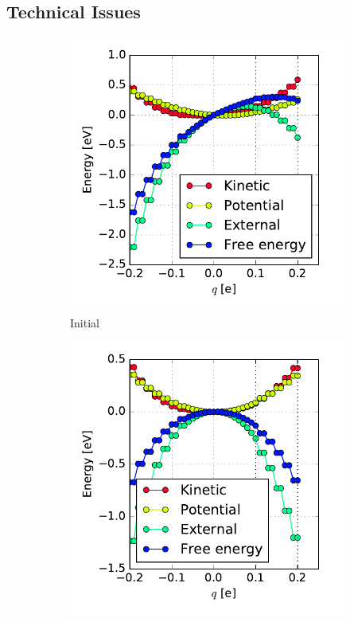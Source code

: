 \subsection{Technical Issues}
\label{section_technical_issues}
\begin{figure}
	\centering
	\begin{subfigure}{0.45\textwidth}
		\centering
		\includegraphics[width = \textwidth]{Images/Hydrogen/charging/energy_contributions_asymmetric}
		\caption{Initial}
		\label{image_contributions_initial}
	\end{subfigure}\hspace*{1cm}
	\begin{subfigure}{0.45\textwidth}
		\centering
		\includegraphics[width = \textwidth]{Images/Hydrogen/charging/energy_contributions_symmetric}

\end{subfigure}
\end{figure}
